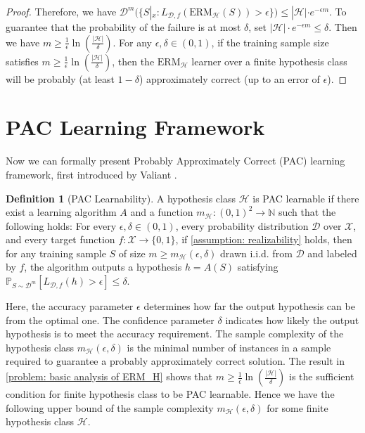 \documentclass[openany, amssymb, psamsfonts]{amsart}
\theoremstyle{definition}
\newtheorem{defn}{Definition}[section]
\numberwithin{equation}{section}
\begin{document}
\begin{proof}
Therefore, we have $\mathcal{D}^m(\{ S|_x \colon L_{\mathcal{D},f}(\text{ERM}_{\mathcal{H}}(S)) > \epsilon \}) \leq |\mathcal{H}| \cdot e^{-\epsilon m}$. To guarantee that the probability of the failure is at most $\delta$, set $|\mathcal{H}| \cdot e^{-\epsilon m} \leq \delta$. Then we have $m \geq \frac{1}{\epsilon} \ln \left( \frac{|\mathcal{H}|}{\delta} \right)$. For any $\epsilon, \delta \in (0,1)$, if the training sample size satisfies $m \ge \frac{1}{\epsilon} \ln \left( \frac{|\mathcal{H}|}{\delta} \right)$, then the $\mathrm{ERM}_{\mathcal{H}}$ learner over a finite hypothesis class will be probably (at least $1 - \delta$) approximately correct (up to an error of $\epsilon$).
\end{proof}

\section{PAC Learning Framework}
Now we can formally present Probably Approximately Correct (PAC) learning framework, first introduced by Valiant \cite{Valiant1984}.

\begin{defn}[PAC Learnability] \label{definition: PAC learnability}
A hypothesis class $\mathcal{H}$ is PAC learnable if there exist a learning algorithm $A$ and a function $m_{\mathcal{H}} : (0,1)^2 \to \mathbb{N}$ such that the following holds: For every $\epsilon, \delta \in (0,1)$, every probability distribution $\mathcal{D}$ over $\mathcal{X}$, and every target function $f:\mathcal{X} \to \{0,1\}$, if \autoref{assumption: realizability} holds, then for any training sample $S$ of size $m \ge m_{\mathcal{H}}(\epsilon, \delta)$ drawn i.i.d. from $\mathcal{D}$ and labeled by $f$, the algorithm outputs a hypothesis $h = A(S)$ satisfying $\mathbb{P}_{S \sim \mathcal{D}^m}[L_{\mathcal{D}, f}(h) > \epsilon] \le \delta$.
\end{defn}

Here, the accuracy parameter $\epsilon$ determines how far the output hypothesis can be from the optimal one. The confidence parameter $\delta$ indicates how likely the output hypothesis is to meet the accuracy requirement. The sample complexity of the hypothesis class $m_\mathcal{H}(\epsilon, \delta)$ is the minimal number of instances in a sample required to guarantee a probably approximately correct solution. The result in \autoref{problem: basic analysis of ERM_H} shows that $m \geq \frac{1}{\epsilon} \ln \left( \frac{|\mathcal{H}|}{\delta} \right)$ is the sufficient condition for finite hypothesis class to be PAC learnable. Hence we have the following upper bound of the sample complexity $m_\mathcal{H}(\epsilon, \delta)$ for some finite hypothesis class $\mathcal{H}$.
\end{document}
